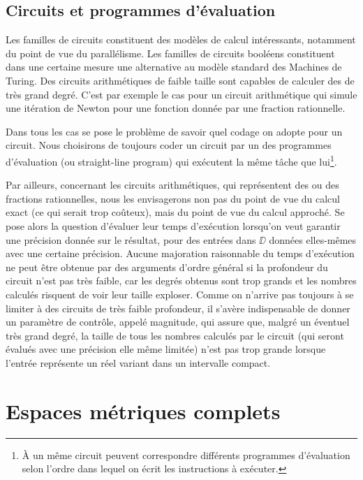 \subsection{Circuits et programmes d'évaluation}\label{fsubsec14} 
Les familles de circuits constituent des modèles de calcul intéressants, 
notamment du point de vue du parallélisme. Les familles de circuits booléens constituent dans une certaine mesure une alternative au modèle standard des Machines de Turing. Des circuits arithmétiques de faible taille sont capables de calculer des \pols de très grand degré. C'est par exemple le cas pour un circuit arithmétique qui simule une itération de Newton pour une fonction donnée par une fraction rationnelle.
 
Dans tous les cas se pose le problème de savoir quel codage on adopte pour un circuit. Nous choisirons de toujours coder un circuit par un des programmes d'évaluation (ou straight-line program) qui exécutent la même tâche que lui\footnote{À un même circuit peuvent correspondre différents programmes d'évaluation selon l'ordre dans lequel on écrit les instructions à exécuter.}.

Par ailleurs, concernant les circuits arithmétiques, qui représentent des 
\pols ou des fractions rationnelles, nous les envisagerons non pas du point de vue du calcul exact (ce qui serait trop coûteux), mais du point de vue du calcul approché. Se pose alors la question d'évaluer leur temps 
d'exécution lorsqu'on veut garantir une précision donnée sur le 
résultat, pour des entrées dans  $\DD$  données elles-mêmes avec une 
certaine précision. Aucune majoration raisonnable du temps d'exécution ne 
peut être obtenue par des arguments d'ordre général si la profondeur du 
circuit n'est pas très faible, car les degrés obtenus sont trop grands et 
les nombres calculés risquent de voir leur taille exploser. Comme on n'arrive pas toujours à se limiter à des circuits de très faible profondeur, il s'avère indispensable de donner un paramètre de contrôle, appelé magnitude, qui assure que, malgré un éventuel très grand degré, la 
taille de tous les nombres calculés par le circuit (qui seront évalués 
avec une précision elle même limitée) n'est pas trop grande lorsque 
l'entrée représente un réel variant dans un intervalle compact. 



\section{Espaces métriques complets \raprs   }\label{fsec2}

